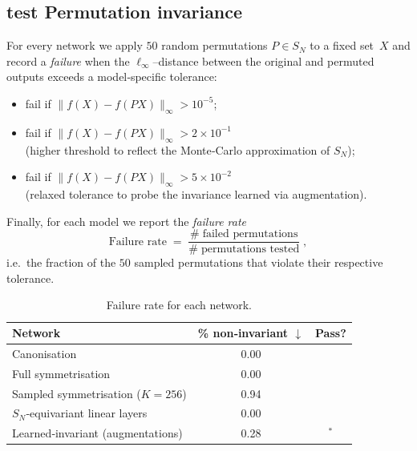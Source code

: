 \subsection*{test Permutation invariance}
For every network we apply $50$ random permutations $P\!\in\!S_N$ to a fixed
set $X$ and record a \emph{failure} when the $\ell_\infty$–distance between the
original and permuted outputs exceeds a model‑specific tolerance:

\begin{itemize}
	\item[(a,b,d)] \hspace*{0.5em}fail if \( \lVert f(X)-f(PX)\rVert_\infty > 10^{-5} \);
	\item[(c)]      \hspace*{1.4em}fail if \( \lVert f(X)-f(PX)\rVert_\infty > 2\times10^{-1} \)\\
	(higher threshold to reflect the Monte‑Carlo approximation of \(S_N\));
	\item[(e)]      \hspace*{1.4em}fail if \( \lVert f(X)-f(PX)\rVert_\infty > 5\times10^{-2} \)\\
	(relaxed tolerance to probe the invariance learned via augmentation).
\end{itemize}
Finally, for each model we report the \emph{failure rate}
\[
\text{Failure rate}
\;=\;
\frac{\#\;\text{failed permutations}}
{\#\;\text{permutations tested}}\;,
\]
i.e.\ the fraction of the $50$ sampled permutations that violate
their respective tolerance.

\begin{table}[h]
	\centering
	\begin{tabular}{lcc}
		\toprule
		\textbf{Network} & \% non‑invariant $\downarrow$ & Pass? \\
		\midrule
		Canonisation                                   & 0.00 & \cmark \\
		Full symmetrisation                            & 0.00 & \cmark \\
		Sampled symmetrisation ($K=256$)               & 0.94 & \xmark \\
		$S_N$‑equivariant linear layers                & 0.00 & \cmark \\
		Learned‑invariant (augmentations)              & 0.28 & \cmark$^{\ast}$ \\
		\bottomrule
	\end{tabular}
	\caption{Failure rate for each network.}
	\label{tab:inv}
\end{table}

